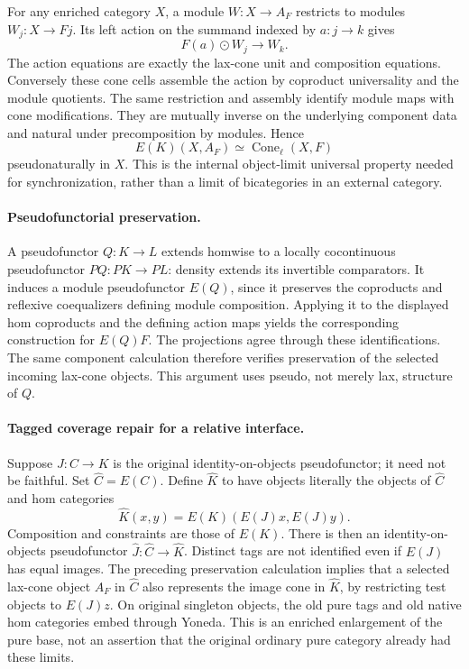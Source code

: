 \documentclass{article}
\begin{document}
For any enriched category $X$, a module $W:X\to A_F$ restricts to modules $W_j:X\to Fj$. Its left action on the summand indexed by $a:j\to k$ gives
\[
 F(a)\odot W_j\longrightarrow W_k.
\]
The action equations are exactly the lax-cone unit and composition equations. Conversely these cone cells assemble the action by coproduct universality and the module quotients. The same restriction and assembly identify module maps with cone modifications. They are mutually inverse on the underlying component data and natural under precomposition by modules. Hence
\[
 E(K)(X,A_F)\simeq\operatorname{Cone}_{\ell}(X,F)
\]
pseudonaturally in $X$. This is the internal object-limit universal property needed for synchronization, rather than a limit of bicategories in an external category.

\paragraph{Pseudofunctorial preservation.} A pseudofunctor $Q:K\to L$ extends homwise to a locally cocontinuous pseudofunctor $PQ:PK\to PL$: density extends its invertible comparators. It induces a module pseudofunctor $E(Q)$, since it preserves the coproducts and reflexive coequalizers defining module composition. Applying it to the displayed hom coproducts and the defining action maps yields the corresponding construction for $E(Q)F$. The projections agree through these identifications. The same component calculation therefore verifies preservation of the selected incoming lax-cone objects. This argument uses pseudo, not merely lax, structure of $Q$.

\paragraph{Tagged coverage repair for a relative interface.} Suppose $J:C\to K$ is the original identity-on-objects pseudofunctor; it need not be faithful. Set $\widehat C=E(C)$. Define $\widehat K$ to have objects literally the objects of $\widehat C$ and hom categories
\[
 \widehat K(x,y)=E(K)(E(J)x,E(J)y).
\]
Composition and constraints are those of $E(K)$. There is then an identity-on-objects pseudofunctor $\widehat J:\widehat C\to\widehat K$. Distinct tags are not identified even if $E(J)$ has equal images. The preceding preservation calculation implies that a selected lax-cone object $A_F$ in $\widehat C$ also represents the image cone in $\widehat K$, by restricting test objects to $E(J)z$. On original singleton objects, the old pure tags and old native hom categories embed through Yoneda. This is an enriched enlargement of the pure base, not an assertion that the original ordinary pure category already had these limits.
\end{document}

